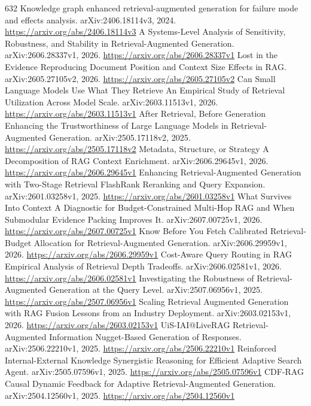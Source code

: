 \documentclass[11pt]{article}
\begin{document}
\begin{thebibliography}{632}
 Knowledge graph enhanced retrieval-augmented generation for failure mode and effects analysis. arXiv:2406.18114v3, 2024. \url{https://arxiv.org/abs/2406.18114v3}
 A Systems-Level Analysis of Sensitivity, Robustness, and Stability in Retrieval-Augmented Generation. arXiv:2606.28337v1, 2026. \url{https://arxiv.org/abs/2606.28337v1}
 Lost in the Evidence Reproducing Document Position and Context Size Effects in RAG. arXiv:2605.27105v2, 2026. \url{https://arxiv.org/abs/2605.27105v2}
 Can Small Language Models Use What They Retrieve An Empirical Study of Retrieval Utilization Across Model Scale. arXiv:2603.11513v1, 2026. \url{https://arxiv.org/abs/2603.11513v1}
 After Retrieval, Before Generation Enhancing the Trustworthiness of Large Language Models in Retrieval-Augmented Generation. arXiv:2505.17118v2, 2025. \url{https://arxiv.org/abs/2505.17118v2}
 Metadata, Structure, or Strategy A Decomposition of RAG Context Enrichment. arXiv:2606.29645v1, 2026. \url{https://arxiv.org/abs/2606.29645v1}
 Enhancing Retrieval-Augmented Generation with Two-Stage Retrieval FlashRank Reranking and Query Expansion. arXiv:2601.03258v1, 2025. \url{https://arxiv.org/abs/2601.03258v1}
 What Survives Into Context A Diagnostic for Budget-Constrained Multi-Hop RAG and When Submodular Evidence Packing Improves It. arXiv:2607.00725v1, 2026. \url{https://arxiv.org/abs/2607.00725v1}
 Know Before You Fetch Calibrated Retrieval-Budget Allocation for Retrieval-Augmented Generation. arXiv:2606.29959v1, 2026. \url{https://arxiv.org/abs/2606.29959v1}
 Cost-Aware Query Routing in RAG Empirical Analysis of Retrieval Depth Tradeoffs. arXiv:2606.02581v1, 2026. \url{https://arxiv.org/abs/2606.02581v1}
 Investigating the Robustness of Retrieval-Augmented Generation at the Query Level. arXiv:2507.06956v1, 2025. \url{https://arxiv.org/abs/2507.06956v1}
 Scaling Retrieval Augmented Generation with RAG Fusion Lessons from an Industry Deployment. arXiv:2603.02153v1, 2026. \url{https://arxiv.org/abs/2603.02153v1}
 UiS-IAI@LiveRAG Retrieval-Augmented Information Nugget-Based Generation of Responses. arXiv:2506.22210v1, 2025. \url{https://arxiv.org/abs/2506.22210v1}
 Reinforced Internal-External Knowledge Synergistic Reasoning for Efficient Adaptive Search Agent. arXiv:2505.07596v1, 2025. \url{https://arxiv.org/abs/2505.07596v1}
 CDF-RAG Causal Dynamic Feedback for Adaptive Retrieval-Augmented Generation. arXiv:2504.12560v1, 2025. \url{https://arxiv.org/abs/2504.12560v1}

\end{thebibliography}
\end{document}

